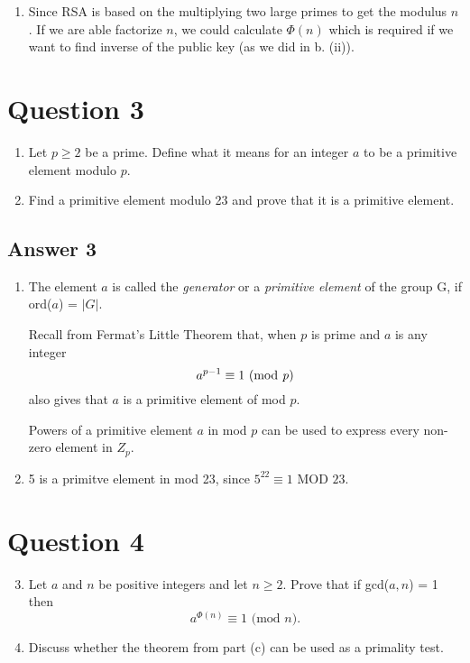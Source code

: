 \documentclass{article}
\begin{document}
\begin{enumerate}
\begin{enumerate}
		\end{enumerate}
		
		\item Since RSA is based on the multiplying two large primes to get the modulus $n$. If we are able factorize $n$, we could calculate $\Phi(n)$ which is required if we want to find inverse of the public key (as we did in b. (ii)). 
	\end{enumerate}	

	\medspace

	\section*{Question 3}
	\renewcommand{\theenumi}{\alph{enumi}}
	\begin{enumerate}
		\item Let $p \ge 2$ be a prime. Define what it means for an integer $a$ to be a primitive element modulo $p$.
		
		\item Find a primitive element modulo 23 and prove that it is a primitive element.
	\end{enumerate}	

	\subsection*{Answer 3}
	\renewcommand{\theenumi}{\alph{enumi}}
	\begin{enumerate}
		\item The element $a$ is called the \textit{generator} or a \textit{primitive element} of the group G, if ord($a$) = $|G|$.
		
		Recall from Fermat's Little Theorem that, when $p$ is prime and $a$ is any integer 
		$$a^{p-1} \equiv 1 \text{ (mod \textit{p})}$$
		also gives that $a$ is a primitive element of mod $p$. 
		
		Powers of a primitive element $a$ in mod $p$ can be used to express every non-zero element in $Z_p$.
		
		\item 5 is a primitve element in mod 23, since $5^{22} \equiv 1 \text{ MOD } 23$. 
	\end{enumerate}	
		
	\medspace
	
	\section*{Question 4}
	\renewcommand{\theenumi}{\alph{enumi}}
	\begin{enumerate}
		\setcounter{enumi}{2}
		\item Let $a$ and $n$ be positive integers and let $n  \ge 2$. Prove that if gcd($a, n$) = 1 then
		$$
		a^{\Phi(n)} \equiv 1 \text{ (mod $n$)}.
		$$
		
		\item Discuss whether the theorem from part (c) can be used as a primality test.
	\end{enumerate}	
\end{document}
